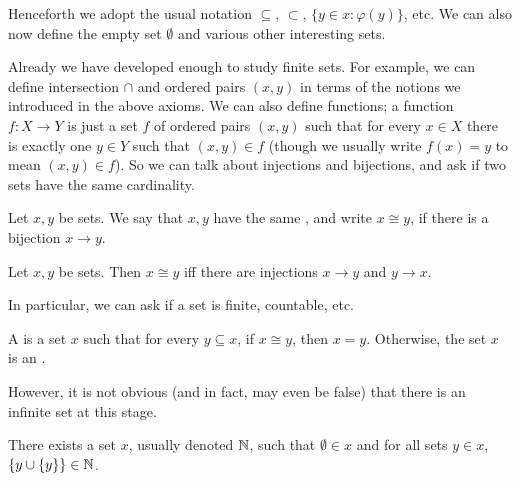 \begin{subsec}
Henceforth we adopt the usual notation $\subseteq$, $\subset$, $\{y \in x: \varphi(y)\}$, etc.
We can also now define the empty set $\emptyset$ and various other interesting sets.
\end{subsec}

\begin{subsec}
Already we have developed enough to study finite sets.
For example, we can define intersection $\cap$ and ordered pairs $(x, y)$ in terms of the notions we introduced in the above axioms.
We can also define functions; a function $f: X \to Y$ is just a set $f$ of ordered pairs $(x, y)$ such that for every $x \in X$ there is exactly one $y \in Y$ such that $(x, y) \in f$ (though we usually write $f(x) = y$ to mean $(x, y) \in f$).
So we can talk about injections and bijections, and ask if two sets have the same cardinality.
\end{subsec}

\begin{definition}
Let $x, y$ be sets. We say that $x, y$ have the same , and write $x \cong y$, if there is a bijection $x \to y$.
\end{definition}

\begin{theorem}
Let $x, y$ be sets. Then $x \cong y$ iff there are injections $x \to y$ and $y \to x$.
\end{theorem}

\begin{subsec}
In particular, we can ask if a set is finite, countable, etc.
\end{subsec}

\begin{definition}
A  is a set $x$ such that for every $y \subseteq x$, if $x \cong y$, then $x = y$.
Otherwise, the set $x$ is an .
\end{definition}

\begin{subsec}
However, it is not obvious (and in fact, may even be false) that there is an infinite set at this stage.
\end{subsec}

\begin{axiom}[infinity]
There exists a set $x$, usually denoted $\mathbb{N}$, such that $\emptyset \in x$ and for all sets $y \in x$, $\{y \cup \{y\}\} \in \mathbb{N}$.
\end{axiom}

